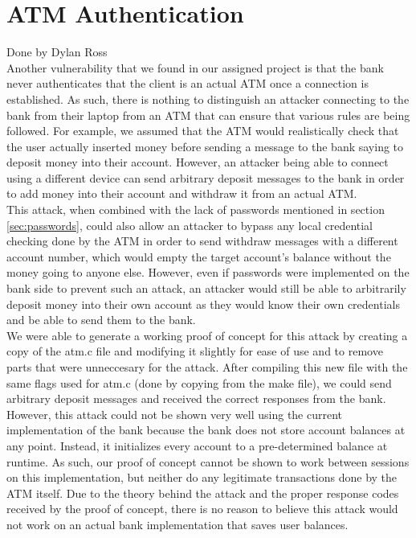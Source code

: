 \section{ATM Authentication}\label{sec:authentication}
Done by Dylan Ross\\

	\medskip
	Another vulnerability that we found in our assigned project is that the bank never authenticates that the client is an actual ATM once a connection is established. As such, there is nothing
	to distinguish an attacker connecting to the bank from their laptop from an ATM that can ensure that various rules are being followed. For example, we assumed that the ATM would realistically
	check that the user actually inserted money before sending a message to the bank saying to deposit money into their account. However, an attacker being able to connect using a different device
	can send arbitrary deposit messages to the bank in order to add money into their account and withdraw it from an actual ATM.\\

	This attack, when combined with the lack of passwords mentioned in section \ref{sec:passwords}, could also allow an attacker to bypass any local credential checking done by the ATM in order
	to send withdraw messages with a different account number, which would empty the target account's balance without the money going to anyone else. However, even if passwords were implemented on
	the bank side to prevent such an attack, an attacker would still be able to arbitrarily deposit money into their own account as they would know their own credentials and be able to send them
	to the bank.\\

	We were able to generate a working proof of concept for this attack by creating a copy of the atm.c file and modifying it slightly for ease of use and to remove parts that were unneccesary for
	the attack. After compiling this new file with the same flags used for atm.c (done by copying from the make file), we could send arbitrary deposit messages and received the correct responses
	from the bank. However, this attack could not be shown very well using the current implementation of the bank because the bank does not store account balances at any point. Instead, it
	initializes every account to a pre-determined balance at runtime. As such, our proof of concept cannot be shown to work between sessions on this implementation, but neither do any legitimate
	transactions done by the ATM itself. Due to the theory behind the attack and the proper response codes received by the proof of concept, there is no reason to believe this attack would not
	work on an actual bank implementation that saves user balances.
